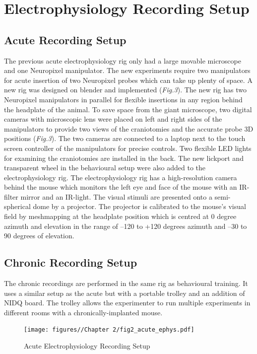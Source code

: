 \section{Electrophysiology Recording Setup}
\subsection{Acute Recording Setup}
The previous acute electrophysiology rig only had a large movable microscope and one Neuropixel manipulator. The new experiments require two manipulators for acute insertion of two Neuropixel probes which can take up plenty of space. A new rig was designed on blender and implemented (\textit{Fig.3}). The new rig has two Neuropixel manipulators in parallel for flexible insertions in any region behind the headplate of the animal. To save space from the giant microscope, two digital cameras with microscopic lens were placed on left and right sides of the manipulators to provide two views of the craniotomies and the accurate probe 3D positions (\textit{Fig.3}). The two cameras are connected to a laptop next to the touch screen controller of the manipulators for precise controls. Two flexible LED lights for examining the craniotomies are installed in the back. The new lickport and transparent wheel in the behavioural setup were also added to the electrophysiology rig. The electrophysiology rig has a high-resolution camera behind the mouse which monitors the left eye and face of the mouse with an IR-filter mirror and an IR-light. The visual stimuli are presented onto a semi-spherical dome by a projector. The projector is calibrated to the mouse’s visual field by meshmapping at the headplate position which is centred at 0 degree azimuth and elevation in the range of –120 to +120 degrees azimuth and –30 to 90 degrees of elevation. 

\subsection{Chronic Recording Setup}
The chronic recordings are performed in the same rig as behavioural training. It uses a similar setup as the acute but with a portable trolley and an addition of NIDQ board. The trolley allows the experimenter to run multiple experiments in different rooms with a chronically-implanted mouse.
\begin{figure}
    \centering
    \texttt{[image: figures//Chapter 2/fig2\_acute\_ephys.pdf]}
    \caption{Acute Electrophysiology Recording Setup}
    \label{fig:placeholder}
\end{figure}
